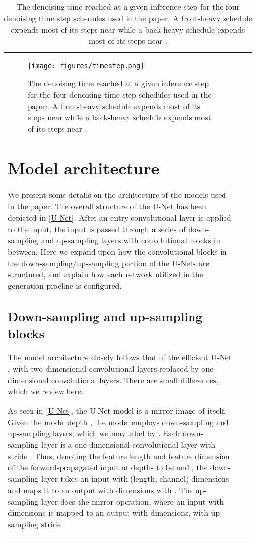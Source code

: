 \documentclass[nohyperref]{article}
\theoremstyle{plain}
\theoremstyle{definition}
\theoremstyle{remark}
\begin{document}
\begin{table}[t!]
{\begin{tabular}{lrr}
\begin{figure}[h!]
\begin{center}
\centerline{
\texttt{[image: figures/timestep.png]}}
\caption{The denoising time reached at a given inference step for the four denoising time step schedules used in the paper. A front-heavy schedule expends most of its steps near  while a back-heavy schedule expends most of its steps near .}
\label{figure:dn}
\end{center}
\vskip -0.2in
\end{figure}


\section{Model architecture}
\label{app:architecture}

We present some details on the architecture of the models used in the paper. The overall structure of the U-Net has been depicted in \cref{U-Net}. After an entry convolutional layer is applied to the input, the input is passed through a series of down-sampling and up-sampling layers with convolutional blocks in between. Here we expand upon how the convolutional blocks in the down-sampling/up-sampling portion of the U-Nets are structured, and explain how each network utilized in the generation pipeline is configured.

\subsection{Down-sampling and up-sampling blocks}

The model architecture closely follows that of the efficient U-Net \cite{saharia2022photorealistic}, with two-dimensional convolutional layers replaced by one-dimensional convolutional layers. There are small differences, which we review here.

As seen in \cref{U-Net}, the U-Net model is a mirror image of itself. Given the model depth , the model employs  down-sampling and  up-sampling layers, which we may label by . Each down-sampling layer is a one-dimensional convolutional layer with stride . Thus, denoting the feature length and feature dimension of the forward-propagated input at depth- to be  and , the down-sampling layer takes an input with (length, channel) dimensions  and maps it to an output with dimensions  with . The up-sampling layer does the mirror operation, where an input with  dimensions is mapped to an output with  dimensions, with up-sampling stride .


\end{tabular}}
\end{table}
\end{document}
